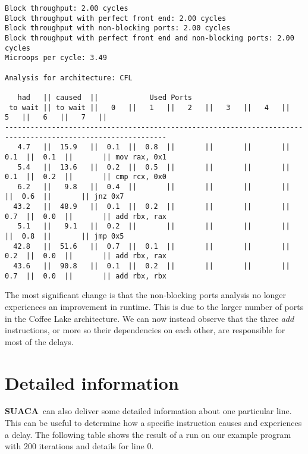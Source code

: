 \documentclass[a4paper,12pt,titlepage, twoside]{report}
\newcommand{\suaca}{\textbf{SUACA}}
\begin{document}
\begin{mdframed}[backgroundcolor=light-gray, roundcorner=10pt,leftmargin=1, rightmargin=1, innerleftmargin=15, innertopmargin=15,innerbottommargin=15, outerlinewidth=1, linecolor=light-gray]
\begin{center}
\begin{BVerbatim}[fontsize=\tiny]
Block throughput: 2.00 cycles
Block throughput with perfect front end: 2.00 cycles
Block throughput with non-blocking ports: 2.00 cycles
Block throughput with perfect front end and non-blocking ports: 2.00 cycles
Microops per cycle: 3.49

Analysis for architecture: CFL

   had   || caused  ||            Used Ports
 to wait || to wait ||   0   ||   1   ||   2   ||   3   ||   4   ||   5   ||   6   ||   7   ||
------------------------------------------------------------------------------------------------------------
   4.7   ||  15.9   ||  0.1  ||  0.8  ||       ||       ||       ||  0.1  ||  0.1  ||       || mov rax, 0x1
   5.4   ||  13.6   ||  0.2  ||  0.5  ||       ||       ||       ||  0.1  ||  0.2  ||       || cmp rcx, 0x0
   6.2   ||   9.8   ||  0.4  ||       ||       ||       ||       ||       ||  0.6  ||       || jnz 0x7
  43.2   ||  48.9   ||  0.1  ||  0.2  ||       ||       ||       ||  0.7  ||  0.0  ||       || add rbx, rax
   5.1   ||   9.1   ||  0.2  ||       ||       ||       ||       ||       ||  0.8  ||       || jmp 0x5
  42.8   ||  51.6   ||  0.7  ||  0.1  ||       ||       ||       ||  0.2  ||  0.0  ||       || add rbx, rax
  43.6   ||  90.8   ||  0.1  ||  0.2  ||       ||       ||       ||  0.7  ||  0.0  ||       || add rbx, rbx
\end{BVerbatim}
\end{center}
\end{mdframed}

The most significant change is that the non-blocking ports analysis no longer experiences an improvement in runtime. This is due to the larger number of ports in the Coffee Lake architecture. We can now instead observe that the three $add$ instructions, or more so their dependencies on each other, are responsible for most of the delays.



\section{Detailed information}
\label{sec:detail}

\suaca\ can also deliver some detailed information about one particular line. This can be useful to determine how a specific instruction causes and experiences a delay. The following table shows the result of a run on our example program with $200$ iterations and details for line $0$.
\end{document}
